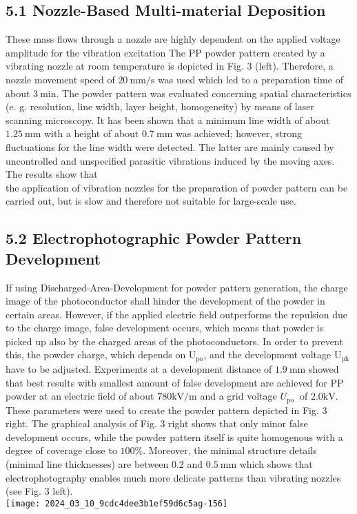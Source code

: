 \documentclass[10pt]{article}
\begin{document}
\subsection*{5.1 Nozzle-Based Multi-material Deposition}
These mass flows through a nozzle are highly dependent on the applied voltage amplitude for the vibration excitation The PP powder pattern created by a vibrating nozzle at room temperature is depicted in Fig. 3 (left). Therefore, a nozzle movement speed of $20 \mathrm{~mm} / \mathrm{s}$ was used which led to a preparation time of about $3 \mathrm{~min}$. The powder pattern was evaluated concerning spatial characteristics (e. g. resolution, line width, layer height, homogeneity) by means of laser scanning microscopy. It has been shown that a minimum line width of about $1.25 \mathrm{~mm}$ with a height of about $0.7 \mathrm{~mm}$ was achieved; however, strong fluctuations for the line width were detected. The latter are mainly caused by uncontrolled and unspecified parasitic vibrations induced by the moving axes. The results show that\\
the application of vibration nozzles for the preparation of powder pattern can be carried out, but is slow and therefore not suitable for large-scale use.

\subsection*{5.2 Electrophotographic Powder Pattern Development}
If using Discharged-Area-Development for powder pattern generation, the charge image of the photoconductor shall hinder the development of the powder in certain areas. However, if the applied electric field outperforms the repulsion due to the charge image, false development occurs, which means that powder is picked up also by the charged areas of the photoconductors. In order to prevent this, the powder charge, which depends on $\mathrm{U}_{\mathrm{po}}$, and the development voltage $\mathrm{U}_{\mathrm{ph}}$ have to be adjusted. Experiments at a development distance of $1.9 \mathrm{~mm}$ showed that best results with smallest amount of false development are achieved for PP powder at an electric field of about $780 \mathrm{kV} / \mathrm{m}$ and a grid voltage $U_{\text {po }}$ of $2.0 \mathrm{kV}$. These parameters were used to create the powder pattern depicted in Fig. 3 right. The graphical analysis of Fig. 3 right shows that only minor false development occurs, while the powder pattern itself is quite homogenous with a degree of coverage close to $100 \%$. Moreover, the minimal structure details (minimal line thicknesses) are between 0.2 and $0.5 \mathrm{~mm}$ which shows that electrophotography enables much more delicate patterns than vibrating nozzles (see Fig. 3 left).\\
\texttt{[image: 2024\_03\_10\_9cdc4dee3b1ef59d6c5ag-156]}
\end{document}
